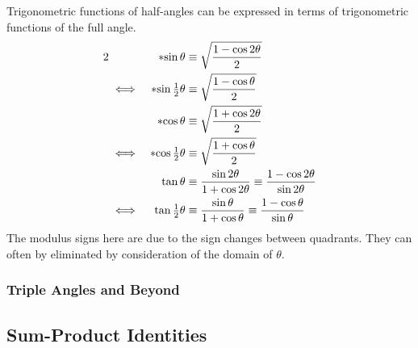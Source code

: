 \begin{theorem} \label{thm_trig_half_angle}
Trigonometric functions of half-angles can be expressed in terms of
trigonometric functions of the full angle.
\begin{alignat*}2
&&\abs*{\sin \theta} &\equiv
    \sqrt{\frac{1 - \cos 2 \theta} 2} \\
&\iff& \abs*{\sin \tfrac 12 \theta} &\equiv
    \sqrt{\frac{1 - \cos \theta} 2} \\
&&\abs*{\cos \theta} &\equiv
    \sqrt{\frac{1 + \cos 2 \theta} 2} \\
&\iff& \abs*{\cos \tfrac 12 \theta} &\equiv
    \sqrt{\frac{1 + \cos \theta} 2} \\
&&\tan \theta &\equiv
    \frac{\sin 2 \theta}{1 + \cos 2 \theta}
    \equiv \frac{1 - \cos 2 \theta}{\sin 2 \theta} \\
&\iff& \tan \tfrac 12 \theta &\equiv
    \frac{\sin \theta}{1 + \cos \theta}
    \equiv \frac{1 - \cos \theta}{\sin \theta}
\end{alignat*}
The modulus signs here are due to the sign changes between quadrants. They can
often by eliminated by consideration of the domain of \(\theta\).
\end{theorem}

\subsubsection{Triple Angles and Beyond}

\subsection{Sum-Product Identities} \label{sec_trig_sum_product}

